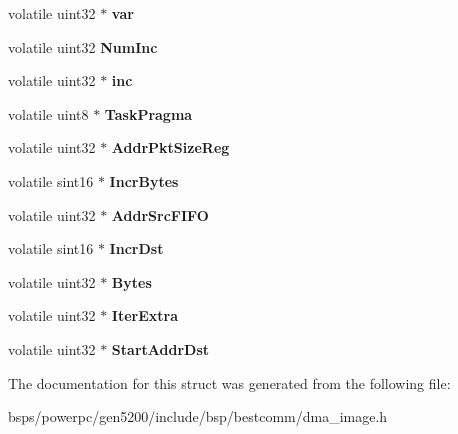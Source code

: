 \begin{DoxyCompactItemize}
\mbox{\label{structtask__info1_a1b3d484fcef7f4cd11e358390defb65d}} 
volatile uint32 $\ast$ {\bfseries var}
\item 
\mbox{\label{structtask__info1_aedff56838fa55e895c7c5acdf1950102}} 
volatile uint32 {\bfseries Num\+Inc}
\item 
\mbox{\label{structtask__info1_a9d92862fb665b1662969b883897a27c8}} 
volatile uint32 $\ast$ {\bfseries inc}
\item 
\mbox{\label{structtask__info1_a03c347525c4deb460b5cfe56ba9a830c}} 
volatile uint8 $\ast$ {\bfseries Task\+Pragma}
\item 
\mbox{\label{structtask__info1_a30cd72fadc26caa0b884261a2ab451d3}} 
volatile uint32 $\ast$ {\bfseries Addr\+Pkt\+Size\+Reg}
\item 
\mbox{\label{structtask__info1_a8df2b259a5aa420ceee835554ad33f97}} 
volatile sint16 $\ast$ {\bfseries Incr\+Bytes}
\item 
\mbox{\label{structtask__info1_ac981bbe3e25bb533162a4eae5b39a48c}} 
volatile uint32 $\ast$ {\bfseries Addr\+Src\+F\+I\+FO}
\item 
\mbox{\label{structtask__info1_af1f8385be8709a41135a50bec98fc52f}} 
volatile sint16 $\ast$ {\bfseries Incr\+Dst}
\item 
\mbox{\label{structtask__info1_a0a03d22b19b7a3c36f5023f76a47799c}} 
volatile uint32 $\ast$ {\bfseries Bytes}
\item 
\mbox{\label{structtask__info1_a73ad1b2205eeb10fe08e3708032c0a30}} 
volatile uint32 $\ast$ {\bfseries Iter\+Extra}
\item 
\mbox{\label{structtask__info1_ad833ee5009bbb59aaf2f9ebab38bb7a7}} 
volatile uint32 $\ast$ {\bfseries Start\+Addr\+Dst}
\end{DoxyCompactItemize}


The documentation for this struct was generated from the following file\+:\begin{DoxyCompactItemize}
\item 
bsps/powerpc/gen5200/include/bsp/bestcomm/dma\+\_\+image.\+h\end{DoxyCompactItemize}

